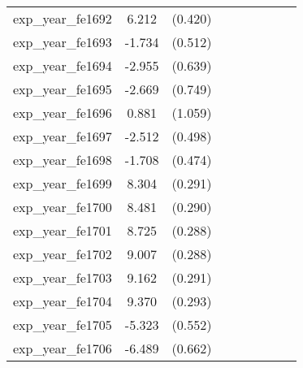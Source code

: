 {\begin{tabular}{l*{4}{cc}}
exp\_year\_fe1692&    6.212\sym{***}&  (0.420)&                  &         &                  &         &                  &         \\
exp\_year\_fe1693&   -1.734\sym{***}&  (0.512)&                  &         &                  &         &                  &         \\
exp\_year\_fe1694&   -2.955\sym{***}&  (0.639)&                  &         &                  &         &                  &         \\
exp\_year\_fe1695&   -2.669\sym{***}&  (0.749)&                  &         &                  &         &                  &         \\
exp\_year\_fe1696&    0.881         &  (1.059)&                  &         &                  &         &                  &         \\
exp\_year\_fe1697&   -2.512\sym{***}&  (0.498)&                  &         &                  &         &                  &         \\
exp\_year\_fe1698&   -1.708\sym{***}&  (0.474)&                  &         &                  &         &                  &         \\
exp\_year\_fe1699&    8.304\sym{***}&  (0.291)&                  &         &                  &         &                  &         \\
exp\_year\_fe1700&    8.481\sym{***}&  (0.290)&                  &         &                  &         &                  &         \\
exp\_year\_fe1701&    8.725\sym{***}&  (0.288)&                  &         &                  &         &                  &         \\
exp\_year\_fe1702&    9.007\sym{***}&  (0.288)&                  &         &                  &         &                  &         \\
exp\_year\_fe1703&    9.162\sym{***}&  (0.291)&                  &         &                  &         &                  &         \\
exp\_year\_fe1704&    9.370\sym{***}&  (0.293)&                  &         &                  &         &                  &         \\
exp\_year\_fe1705&   -5.323\sym{***}&  (0.552)&                  &         &                  &         &                  &         \\
exp\_year\_fe1706&   -6.489\sym{***}&  (0.662)&                  &         &                  &         &                  &         \\

\end{tabular}}
